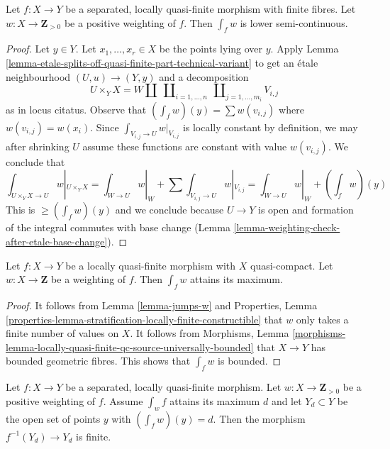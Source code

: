 \begin{lemma}
\label{lemma-semicontinuous-int-w}
Let $f : X \to Y$ be a separated, locally quasi-finite morphism
with finite fibres.
Let $w : X \to \mathbf{Z}_{> 0}$ be a positive weighting of $f$.
Then $\int_f w$ is lower semi-continuous.
\end{lemma}

\begin{proof}
Let $y \in Y$. Let $x_1, \ldots, x_r \in X$ be the points lying over $y$.
Apply
Lemma \ref{lemma-etale-splits-off-quasi-finite-part-technical-variant}
to get an \'etale neighbourhood $(U, u) \to (Y, y)$ and a decomposition
$$
U \times_Y X =
W \amalg
\ \coprod\nolimits_{i = 1, \ldots, n}
\ \coprod\nolimits_{j = 1, \ldots, m_i}
V_{i, j}
$$
as in locus citatus. Observe that $(\int_f w)(y) = \sum w(v_{i, j})$
where $w(v_{i, j}) = w(x_i)$. Since $\int_{V_{i, j} \to U} w|_{V_{i, j}}$
is locally constant by definition, we may after shrinking $U$
assume these functions are constant with value $w(v_{i, j})$.
We conclude that
$$
\textstyle{\int}_{U \times_Y X \to U} w|_{U \times_Y X} =
\textstyle{\int}_{W \to U} w|_W +
\sum \textstyle{\int}_{V_{i, j} \to U} w|_{V_{i, j}} =
\textstyle{\int}_{W \to U} w|_W + (\int_f w)(y)
$$
This is $\geq (\int_f w)(y)$ and we conclude because $U \to Y$
is open and formation of the integral commutes with base change
(Lemma \ref{lemma-weighting-check-after-etale-base-change}).
\end{proof}

\begin{lemma}
\label{lemma-max-int-w}
Let $f : X \to Y$ be a locally quasi-finite morphism
with $X$ quasi-compact. Let $w : X \to \mathbf{Z}$ be a weighting of $f$.
Then $\int_f w$ attains its maximum.
\end{lemma}

\begin{proof}
It follows from Lemma \ref{lemma-jumps-w} and
Properties, Lemma
\ref{properties-lemma-stratification-locally-finite-constructible}
that $w$ only takes a finite number of values on $X$.
It follows from Morphisms, Lemma
\ref{morphisms-lemma-locally-quasi-finite-qc-source-universally-bounded}
that $X \to Y$ has bounded geometric fibres.
This shows that $\int_f w$ is bounded.
\end{proof}

\begin{lemma}
\label{lemma-max-int-finite}
Let $f : X \to Y$ be a separated, locally quasi-finite morphism.
Let $w : X \to \mathbf{Z}_{> 0}$ be a positive weighting of $f$.
Assume $\int_w f$ attains its maximum $d$ and let $Y_d \subset Y$
be the open set of points $y$ with $(\int_f w)(y) = d$. Then
the morphism $f^{-1}(Y_d) \to Y_d$ is finite.
\end{lemma}

